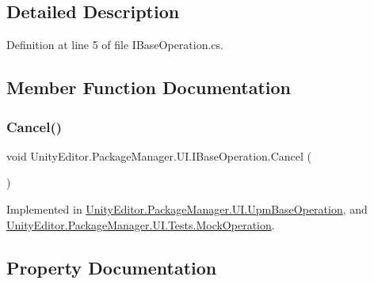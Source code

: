 \subsection{Detailed Description}


Definition at line 5 of file I\+Base\+Operation.\+cs.



\subsection{Member Function Documentation}
\mbox{\label{interface_unity_editor_1_1_package_manager_1_1_u_i_1_1_i_base_operation_ab924259fe1ff324c238ae37c96c42c1e}} 
\subsubsection{\texorpdfstring{Cancel()}{Cancel()}}
{\footnotesize\ttfamily void Unity\+Editor.\+Package\+Manager.\+U\+I.\+I\+Base\+Operation.\+Cancel (\begin{DoxyParamCaption}{ }\end{DoxyParamCaption})}



Implemented in \mbox{\hyperlink{class_unity_editor_1_1_package_manager_1_1_u_i_1_1_upm_base_operation_a4e52e6586c22b12c9b25f905f6fd2a25}{Unity\+Editor.\+Package\+Manager.\+U\+I.\+Upm\+Base\+Operation}}, and \mbox{\hyperlink{class_unity_editor_1_1_package_manager_1_1_u_i_1_1_tests_1_1_mock_operation_a8d5c37459e639081a1812925336e2756}{Unity\+Editor.\+Package\+Manager.\+U\+I.\+Tests.\+Mock\+Operation}}.



\subsection{Property Documentation}
\mbox{\label{interface_unity_editor_1_1_package_manager_1_1_u_i_1_1_i_base_operation_afd5cd3a0d72355105f5ba5e6ad373d1a}} 
